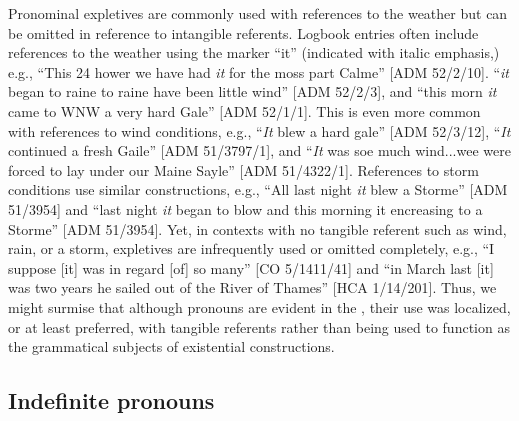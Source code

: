Pronominal expletives are commonly used with references to the weather but can be omitted in reference to intangible referents.  Logbook entries often include references to the weather using the  marker “it” (indicated with italic emphasis,) e.g., “This 24 hower we have had \textit{it} for the moss part Calme” [ADM 52/2/10]. “\textit{it} began to raine to raine have been little wind” [ADM 52/2/3], and “this morn \textit{it} came to WNW a very hard Gale” [ADM 52/1/1]. This is even more common with references to wind conditions, e.g., “\textit{It} blew a hard gale” [ADM 52/3/12], “\textit{It} continued a fresh Gaile” [ADM 51/3797/1], and “\textit{It} was soe much wind...wee were forced to lay under our Maine Sayle” [ADM 51/4322/1]. References to storm conditions use similar constructions, e.g., “All last night \textit{it} blew a Storme” [ADM 51/3954] and “last night \textit{it} began to blow and this morning it encreasing to a Storme” [ADM 51/3954]. Yet, in contexts with no tangible referent such as wind, rain, or a storm, expletives are infrequently used or omitted completely, e.g., “I suppose [it] was in regard [of] so many” [CO 5/1411/41] and “in March last [it] was two years he sailed out of the River of Thames” [HCA 1/14/201]. Thus, we might surmise that although  pronouns are evident in the , their use was localized, or at least preferred, with tangible referents rather than being used to function as the grammatical subjects of existential constructions.

\subsection{{Indefinite pronouns}}\label{sec:5.4.4}

